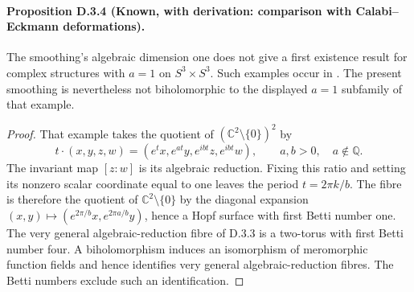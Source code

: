 \paragraph{Proposition D.3.4 (Known, with derivation: comparison with Calabi--Eckmann deformations).}
The smoothing's algebraic dimension one does not give a first
existence result for complex structures with $a=1$ on $S^3\times S^3$.
Such examples occur in \cite[Example~2.3]{manCDP98}. The present
smoothing is nevertheless not biholomorphic to the displayed
$a=1$ subfamily of that example.
\begin{proof}
That example takes the quotient of
$(\mathbb C^2\setminus\{0\})^2$ by
\[
 t\cdot(x,y,z,w)=(e^t x,e^{at}y,e^{ibt}z,e^{ibt}w),
 \qquad a,b>0,\quad a\notin\mathbb Q.
\]
The invariant map $[z:w]$ is its algebraic reduction. Fixing this
ratio and setting its nonzero scalar coordinate equal to one leaves
the period $t=2\pi k/b$. The fibre is therefore the quotient of
$\mathbb C^2\setminus\{0\}$ by the diagonal expansion
$(x,y)\mapsto(e^{2\pi/b}x,e^{2\pi a/b}y)$, hence a Hopf surface
with first Betti number one. The very general algebraic-reduction
fibre of D.3.3 is a two-torus with first Betti number four.
A biholomorphism induces an isomorphism of meromorphic function
fields and hence identifies very general algebraic-reduction fibres.
The Betti numbers exclude such an identification.
\end{proof}
